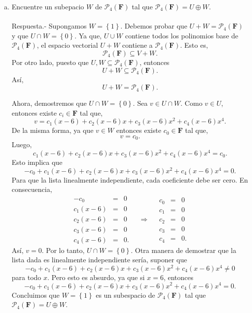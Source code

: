 \begin{enumerate}[\bfseries 1.]
\begin{enumerate}[(a)]
	    \item Encuentre un subepacio $W$ de $\mathcal{P}_4(\textbf{F})$ tal que $\mathcal{P}_4(\textbf{F})=U\oplus W$.\\\\
		Respuesta.-\; Supongamos $W=\left\{1\right\}$. Debemos probar que $U+W=\mathcal{P}_4(\textbf{F})$ y que $U\cap W=\left\{0\right\}$. Ya que, $U\cup W$ contiene todos los polinomios base de $\mathcal{P}_4(\textbf{F})$, el espacio vectorial $U+W$ contiene a $\mathcal{P}_4(\textbf{F})$. Esto es,
		$$\mathcal{P}_4(\textbf{F})\subseteq V+W.$$
		Por otro lado, puesto que $U,W\subseteq \mathcal{P}_4(\textbf{F})$, entonces
		$$U+W\subseteq \mathcal{P}_4(\textbf{F}).$$
		Así, 
		$$U+W=\mathcal{P}_4(\textbf{F}).$$

		Ahora, demostremos que $U\cap W=\left\{0\right\}$. Sea $v\in U\cap W$. Como $v\in U$, entonces  existe $c_i\in \textbf{F}$ tal que,
		$$v=c_1(x-6)+c_2(x-6)x+c_3(x-6)x^2+c_4(x-6)x^4.$$
		De la misma forma, ya que $v\in W$ entonces existe $c_0\in \textbf{F}$ tal que,
		$$v=c_0.$$
		Luego,
		$$c_1(x-6)+c_2(x-6)x+c_3(x-6)x^2+c_4(x-6)x^4=c_0.$$
		Esto implica que
		$$-c_0+c_1(x-6)+c_2(x-6)x+c_3(x-6)x^2+c_4(x-6)x^4=0.$$
		Para que la lista linealmente independiente, cada coeficiente debe ser cero. En consecuencia,
		$$
		\begin{array}{rcl}
		    -c_0&=&0\\
		    c_1(x-6)&=&0\\
		    c_2(x-6)&=&0\\
		    c_3(x-6)&=&0\\
		    c_4(x-6)&=&0.
		\end{array}
		\quad \Rightarrow \quad 
		\begin{array}{rcl}
		    c_0&=&0\\
		    c_1&=&0\\
		    c_2&=&0\\
		    c_3&=&0\\
		    c_4&=&0.
		\end{array}
		$$
		Así, $v=0$. Por lo tanto, $U\cap W=\left\{0\right\}$. Otra manera de demostrar que la lista dada es linealmente independiente sería, suponer que
		$$-c_0+c_1(x-6)+c_2(x-6)x+c_3(x-6)x^2+c_4(x-6)x^4\neq0$$
		para todo $x$. Pero esto es absurdo, ya que si $x=6$, entonces 
		$$-c_0+c_1(x-6)+c_2(x-6)x+c_3(x-6)x^2+c_4(x-6)x^4=0.$$
		Concluimos que $W=\left\{1\right\}$ es un subespacio de $\mathcal{P}_4(\textbf{F})$ tal que $\mathcal{P}_4(\textbf{F})=U\oplus W$.\\\\


\end{enumerate}
\end{enumerate}
